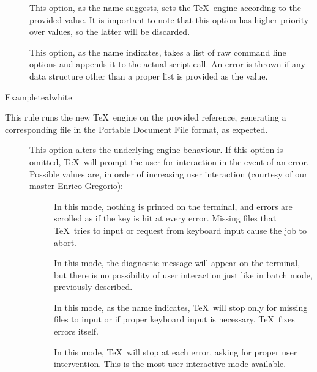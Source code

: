 \begin{description}
\begin{description}
\item[] This option, as the name suggests, sets the \TeX\ engine according to the provided value. It is important to note that this option has higher priority over  values, so the latter will be discarded.

\item[] This option, as the name indicates, takes a list of raw command line options and appends it to the actual script call. An error is thrown if any data structure other than a proper list is provided as the value.
\end{description}

\begin{codebox}{Example}{teal}{\icnote}{white}
\end{codebox}

\item[\rulebox{lualatex}{Marco Daniel, Paulo Cereda}] This rule runs the new  \TeX\ engine on the provided  reference, generating a corresponding file in the Portable Document File format, as expected.

\begin{description}
\item[] This option alters the underlying engine behaviour. If this option is omitted, \TeX\ will prompt the user for interaction in the event of an error. Possible values are, in order of increasing user interaction (courtesy of our master Enrico Gregorio):

\begin{description}
\item[] In this mode, nothing is printed on the terminal, and errors are scrolled as if the  key is hit at every error. Missing files that \TeX\ tries to input or request from keyboard input cause the job to abort.

\item[] In this mode, the diagnostic message will appear on the terminal, but there is no possibility of user interaction just like in batch mode, previously described.

\item[] In this mode, as the name indicates, \TeX\ will stop only for missing files to input or if proper keyboard input is necessary. \TeX\ fixes errors itself.

\item[] In this mode, \TeX\ will stop at each error, asking for proper user intervention. This is the most user interactive mode available.
\end{description}


\end{description}
\end{description}
